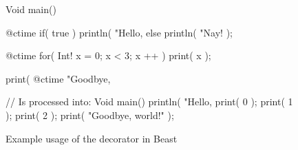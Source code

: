 \documentclass{ExcelAtFIT}
\begin{document}
\begin{figure}[h]
	\begin{code}
Void main() {
	@ctime if( true )
		println( "Hello, %
	else
		println( "Nay! );
		
	@ctime for( Int! x = 0; x < 3; x ++ )
		print( x );
		
	print( @ctime "Goodbye, %
}

// Is processed into:
Void main() {
	println( "Hello, %
	print( 0 );
	print( 1 );
	print( 2 );
	print( "Goodbye, world!" );
}
	\end{code}
	\label{fig:yayNayCode}
	\caption{Example usage of the \ctime decorator in Beast}
\end{figure}

\begin{comment}
\section{Implementation details}
\begin{figure*}[tbh]\centering %
	\centering
	\texttt{[image: compiling\_interpretation.pdf]}
	\caption{Diagram of code processing workflow in Dragon (Beast compiler)}
	\label{fig:compilationInterpretationDia}
\end{figure*}

It is clear that an implementation of the code hatching concept requires the compiler to be able to execute any code during compilation. However for optimal performance, two different interpreters are needed.

\begin{figure}[h]
	\begin{code}
Void main() {
	for( Int! x = 0; x < 50; x ++ ) {
		@ctime Type! T = Int;
		T a = 5;
		T = Bool;
		T b = true;
	}
}
	
// Is processed into:
Void main() {
	for( Int! x = 0; x < 50; x ++ ) {
		Int a = 5;
		Bool b = true;
	}
}
	\end{code}
	\caption{Demonstration of two-level interpretation}
	\label{fig:twoLevelIpret}
\end{figure}

In Figure \ref{fig:twoLevelIpret}, it is not possible to compile the code into standard assembly (or intermediate code) until variable \inlineCode{a} and \inlineCode{b} declarations (which depend on \ctime variable \inlineCode{T}) are resolved. This means that the \ctime code has to be executed in-place and the semantic tree must be built simultaneously with the \ctime code being interpreted (also called \textit{first-order interpretation}). Results of the \textit{first-order interpretation} directly affect further variable definitions and call bindings (as demonstrated in Figure \ref{fig:astctime}), so intermediate code for a first-order interpreter cannot contain more information than an abstract syntax tree (AST). That means that intermediate code generation for the first-order interpreter is pointless.


\end{comment}
\end{document}
